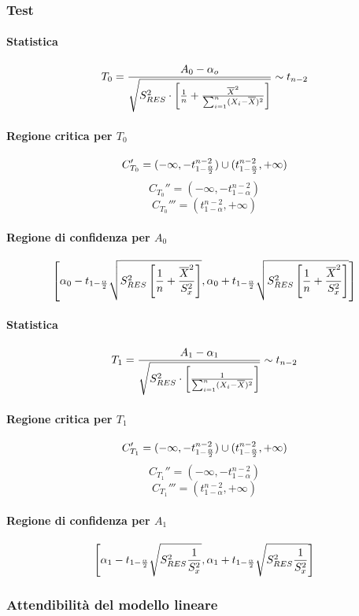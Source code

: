 \documentclass[12pt]{article}
\begin{document}
    \subsubsection{Test}
    \paragraph{Statistica}
    $$T_0 = {{A_0 - \alpha_o}\over{\sqrt{S^2_{RES}\cdot\left[{1\over n}+ {\overline{X}^2 \over \sum_{i=1}^n(X_i - \overline{X})^2}\right]}}} \sim t_{n-2}$$ 
    \paragraph{Regione critica per $T_0$}
    $$C_{T_0}' = (-\infty, -t^{n-2}_{1-{\alpha \over 2}}) \cup (t^{n-2}_{1-{\alpha \over 2}}, +\infty)$$
    $$C_{T_0}'' = (-\infty, -t^{n-2}_{1-\alpha})$$
    $$C_{T_0}''' = (t^{n-2}_{1-\alpha}, +\infty)$$
    \paragraph{Regione di confidenza per $A_0$}
    $$\left[\alpha_0 - t_{1-{\alpha \over 2}}\sqrt{S^2_{RES}\left[{1 \over n} + {\overline{X}^2 \over S_x^2}\right]}, \alpha_0 + t_{1-{\alpha \over 2}}\sqrt{S^2_{RES}\left[{1 \over n} + {\overline{X}^2 \over S_x^2}\right]} \right]$$
    
    \paragraph{Statistica}
    $$T_1 = {{A_1 - \alpha_1}\over{\sqrt{S^2_{RES}\cdot\left[{1 \over \sum_{i=1}^n(X_i - \overline{X})^2}\right]}}} \sim t_{n-2}$$ 
    \paragraph{Regione critica per $T_1$}
    $$C_{T_1}' = (-\infty, -t^{n-2}_{1-{\alpha \over 2}}) \cup (t^{n-2}_{1-{\alpha \over 2}}, +\infty)$$
    $$C_{T_1}'' = (-\infty, -t^{n-2}_{1-\alpha})$$
    $$C_{T_1}''' = (t^{n-2}_{1-\alpha}, +\infty)$$
    \paragraph{Regione di confidenza per $A_1$}
    $$\left[\alpha_1 - t_{1-{\alpha \over 2}}\sqrt{S^2_{RES}{1 \over S_x^2}}, \alpha_1 + t_{1-{\alpha \over 2}}\sqrt{S^2_{RES}{1 \over S_x^2}} \right]$$
    
    \subsubsection{Attendibilità del modello lineare}
\end{document}
